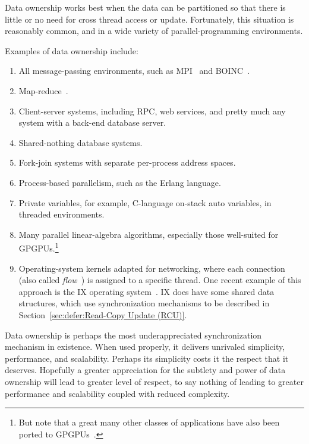 Data ownership works best when the data can be partitioned so that there
is little or no need for cross thread access or update.
Fortunately, this situation is reasonably common, and in a wide variety
of parallel-programming environments.

Examples of data ownership include:

\begin{enumerate}
\item	All message-passing environments, such as MPI~\cite{MPIForum2008}
	and BOINC~\cite{BOINC2008}.
\item	Map-reduce~\cite{MapReduce2008MIT}.
\item	Client-server systems, including RPC, web services, and
	pretty much any system with a back-end database server.
\item	Shared-nothing database systems.
\item	Fork-join systems with separate per-process address spaces.
\item	Process-based parallelism, such as the Erlang language.
\item	Private variables, for example, C-language on-stack auto variables,
	in threaded environments.
\item	Many parallel linear-algebra algorithms, especially those
	well-suited for GPGPUs.\footnote{
		But note that a great many other classes of applications
		have also been ported to
		GPGPUs~\cite{NormMatloff2013ParProcBook,AMD2020ROCm,NVidia2017GPGPU,NVidia2017GPGPU-university}.}
\item	Operating-system kernels adapted for networking, where each connection
	(also called \emph{flow}~\cite{Shenker89,ZhangPhD,McKenney90})
	is assigned to a specific thread.
	One recent example of this approach is the IX operating
	system~\cite{Belay:2016:IOS:3014162.2997641}.
	IX does have some shared data structures, which use synchronization
	mechanisms to be described in
	Section~\ref{sec:defer:Read-Copy Update (RCU)}.
\end{enumerate}

Data ownership is perhaps the most underappreciated synchronization
mechanism in existence.
When used properly, it delivers unrivaled simplicity, performance,
and scalability.
Perhaps its simplicity costs it the respect that it deserves.
Hopefully a greater appreciation for the subtlety and power of data ownership
will lead to greater level of respect, to say nothing of leading to
greater performance and scalability coupled with reduced complexity.


